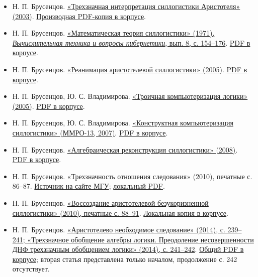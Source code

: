 \documentclass[12pt,a4paper]{article}
\begin{document}
\begin{itemize}
\item Н. П. Брусенцов. \href{https://computer-museum.ru/histussr/trilog0.htm}{«Трехзначная интерпретация силлогистики Аристотеля» (2003)}. \href{../sources/pdfs/Брусенцов_Трехзначная-интерпретация-силлогистики-Аристотеля_2003_версия-музея.pdf}{Производная PDF-копия в корпусе}.
\item Н. П. Брусенцов. \href{https://www.computer-museum.ru/books/setun/brusencov_03.pdf}{«Математическая теория силлогистики» (1971), \emph{Вычислительная техника и вопросы кибернетики}, вып. 8, с. 154–176}. \href{../sources/pdfs/Брусенцов_Математическая-теория-силлогистики_1971.pdf}{PDF в корпусе}.
\item Н. П. Брусенцов. \href{https://ternarycomp.cs.msu.ru/Papers/Rea.pdf}{«Реанимация аристотелевой силлогистики» (2005)}. \href{../sources/pdfs/Брусенцов_Реанимация-аристотелевой-силлогистики_2005-глава-из-Реставрации-логики.pdf}{PDF в корпусе}.
\item Н. П. Брусенцов, Ю. С. Владимирова. \href{https://ternarycomp.cs.msu.ru/Papers/MMRO12.pdf}{«Троичная компьютеризация логики» (2005)}. \href{../sources/pdfs/Брусенцов_Владимирова_Троичная-компьютеризация-логики_2005_ММРО-12.pdf}{PDF в корпусе}.
\item Н. П. Брусенцов, Ю. С. Владимирова. \href{https://ternarycomp.cs.msu.ru/Papers/MMRO13.pdf}{«Конструктная компьютеризация силлогистики» (ММРО-13, 2007)}. \href{../sources/pdfs/Брусенцов_Владимирова_Конструктная-компьютеризация-силлогистики_2007_ММРО-13.pdf}{PDF в корпусе}.
\item Н. П. Брусенцов. \href{https://ternarycomp.cs.msu.ru/Papers/Alrek.pdf}{«Алгебраическая реконструкция силлогистики» (2008)}. \href{../sources/pdfs/Брусенцов_Алгебраическая-реконструкция-силлогистики_2008.pdf}{PDF в корпусе}.
\item Н. П. Брусенцов. «Трехзначность отношения следования» (2010), печатные с. 86–87. \href{https://ternarycomp.cs.msu.ru/Papers/brusentsov_sborn2010_1.pdf}{Источник на сайте МГУ}; \href{../sources/pdfs/Брусенцов_Трехзначность-отношения-следования_2010.pdf}{локальный PDF}.
\item Н. П. Брусенцов. \href{https://ternarycomp.cs.msu.ru/Papers/brusentsov_sborn2010_2.pdf}{«Воссоздание аристотелевой безукоризненной силлогистики» (2010), печатные с. 88–91}. \href{../sources/pdfs/Брусенцов_Воссоздание-аристотелевой-силлогистики_2010.pdf}{Локальная копия в корпусе}.
\item Н. П. Брусенцов. \href{https://ternarycomp.cs.msu.ru/Papers/Brusen_IMI14_Neobh_sled.pdf}{«Аристотелево необходимое следование» (2014), с. 239–241; «Трехзначное обобщение алгебры логики. Преодоление несовершенности ДНФ трехзначным обобщением логики» (2014), с. 241–242}. \href{../sources/pdfs/Брусенцов_Аристотелево-необходимое-следование-и-ДНФ_2014.pdf}{Общий PDF в корпусе}; вторая статья представлена только началом, продолжение с. 242 отсутствует.
\end{itemize}
\end{document}
